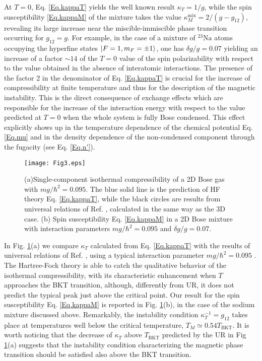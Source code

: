\documentclass[pra,twocolumn,aps,showpacs,longbibliography]{revtex4-1}
\begin{document}
At $T=0$, Eq. \eqref{Eq.kappaT} yields the well known result $\kappa_T= 1/g$, while the spin susceptibility \eqref{Eq.kappaM} of the mixture takes the value $\kappa_M^\mathrm{mix}= 2/(g-g_{12})$, revealing its large increase near the miscible-immiscible phase transition occurring for $g_{12}=g$. For example, in the case of a mixture of ${}^{23}\mathrm{Na}$ atoms occupying the  hyperfine states $\ket{F=1,m_F=\pm 1}$, one has $\delta g/g=0.07$ yielding an increase of a factor $\sim 14$ of the $T=0$ value of the spin polarizability with respect to the value obtained in the absence of interatomic interactions. The presence of the factor 2 in the denominator of Eq. \eqref{Eq.kappaT} is crucial for the increase of compressibility at finite temperature and thus for the description of the magnetic instability. This is the direct consequence of  exchange effects which are responsible for the increase of the  interaction energy with respect to the value predicted at $T=0$ when the whole system is fully Bose condensed. This effect explicitly shows up in the temperature dependence of the chemical potential Eq. \eqref{Eq.mu} and in the density dependence of the non-condensed component through the fugacity (see Eq. \eqref{Eq.n'}).
\par
\begin{figure}[t]
\begin{center}
\texttt{[image: Fig3.eps]}
\caption{(a)Single-component isothermal compressibility of a 2D Bose gas with $mg/\hbar^2=0.095$. The blue solid line is the prediction of HF theory Eq. \eqref{Eq.kappaT}, while the black circles are results from universal relations of Ref. \cite{Prokofev2002}, calculated in the same way as the 3D case. (b) Spin susceptibility Eq. \eqref{Eq.kappaM} in a 2D Bose mixture with interaction parameters $mg/\hbar^2=0.095$ and $\delta g/g=0.07$.} 
\label{fig:thermo2D}
\end{center}
\end{figure}
In Fig. \ref{fig:thermo2D}(a) we compare $\kappa_T$ calculated from Eq. \eqref{Eq.kappaT} with the results of universal relations of Ref. \cite{Prokofev2002}, using a typical interaction parameter $m g/\hbar^2 = 0.095$ \cite{ville_18}. The Hartree-Fock theory is able to catch the qualitative behavior of the isothermal compressibility, with its characteristic enhancement when $T$ approaches the BKT transition, although, differently from UR, it does not predict the typical peak just above the critical point. Our result for the spin susceptibility Eq. \eqref{Eq.kappaM} is reported in Fig. \ref{fig:thermo2D}(b), in the case of the sodium mixture discussed above. Remarkably, the instability condition $\kappa_T^{-1} = g_{12}$ takes place at temperatures well below the critical temperature, $T_M \simeq 0.54 T_\mathrm{BKT}$. It is worth noticing that the decrease of $\kappa_T$ above $T_\mathrm{BKT}$ predicted by the UR in Fig \ref{fig:thermo2D}(a) suggests that the instability condition characterizing the magnetic phase transition should be satisfied also above the BKT transition.
\end{document}

